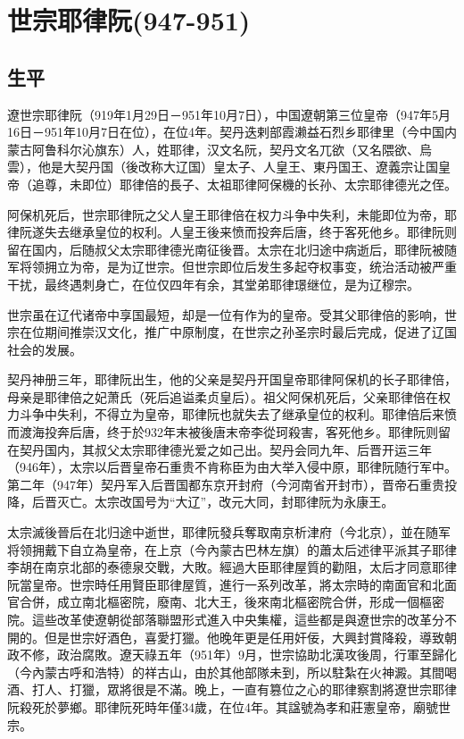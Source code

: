 
\section{世宗耶律阮\tiny(947-951)}

\subsection{生平}

遼世宗耶律阮（919年1月29日－951年10月7日），中国遼朝第三位皇帝（947年5月16日－951年10月7日在位），在位4年。契丹迭剌部霞濑益石烈乡耶律里（今中国内蒙古阿鲁科尔沁旗东）人，姓耶律，汉文名阮，契丹文名兀欲（又名隈欲、烏雲），他是大契丹国（後改称大辽国）皇太子、人皇王、東丹国王、遼義宗让国皇帝（追尊，未即位）耶律倍的長子、太祖耶律阿保機的长孙、太宗耶律德光之侄。

阿保机死后，世宗耶律阮之父人皇王耶律倍在权力斗争中失利，未能即位为帝，耶律阮遂失去继承皇位的权利。人皇王後来愤而投奔后唐，终于客死他乡。耶律阮则留在国内，后随叔父太宗耶律德光南征後晋。太宗在北归途中病逝后，耶律阮被随军将领拥立为帝，是为辽世宗。但世宗即位后发生多起夺权事变，统治活动被严重干扰，最终遇刺身亡，在位仅四年有余，其堂弟耶律璟继位，是为辽穆宗。

世宗虽在辽代诸帝中享国最短，却是一位有作为的皇帝。受其父耶律倍的影响，世宗在位期间推崇汉文化，推广中原制度，在世宗之孙圣宗时最后完成，促进了辽国社会的发展。

契丹神册三年，耶律阮出生，他的父亲是契丹开国皇帝耶律阿保机的长子耶律倍，母亲是耶律倍之妃萧氏（死后追谥柔贞皇后）。祖父阿保机死后，父亲耶律倍在权力斗争中失利，不得立为皇帝，耶律阮也就失去了继承皇位的权利。耶律倍后来愤而渡海投奔后唐，终于於932年末被後唐末帝李從珂殺害，客死他乡。耶律阮则留在契丹国内，其叔父太宗耶律德光爱之如己出。契丹会同九年、后晋开运三年（946年），太宗以后晋皇帝石重贵不肯称臣为由大举入侵中原，耶律阮随行军中。第二年（947年）契丹军入后晋国都东京开封府（今河南省开封市），晋帝石重贵投降，后晋灭亡。太宗改国号为“大辽”，改元大同，封耶律阮为永康王。

太宗滅後晉后在北归途中逝世，耶律阮發兵奪取南京析津府（今北京），並在随军将领拥戴下自立為皇帝，在上京（今內蒙古巴林左旗）的蕭太后述律平派其子耶律李胡在南京北部的泰德泉交戰，大敗。經過大臣耶律屋質的勸阻，太后才同意耶律阮當皇帝。世宗時任用賢臣耶律屋質，進行一系列改革，將太宗時的南面官和北面官合併，成立南北樞密院，廢南、北大王，後來南北樞密院合併，形成一個樞密院。這些改革使遼朝從部落聯盟形式進入中央集權，這些都是與遼世宗的改革分不開的。但是世宗好酒色，喜愛打獵。他晚年更是任用奸佞，大興封賞降殺，導致朝政不修，政治腐敗。遼天祿五年（951年）9月，世宗協助北漢攻後周，行軍至歸化（今內蒙古呼和浩特）的祥古山，由於其他部隊未到，所以駐紮在火神澱。其間喝酒、打人、打獵，眾將很是不滿。晚上，一直有篡位之心的耶律察割將遼世宗耶律阮殺死於夢鄉。耶律阮死時年僅34歲，在位4年。其諡號為孝和莊憲皇帝，廟號世宗。

